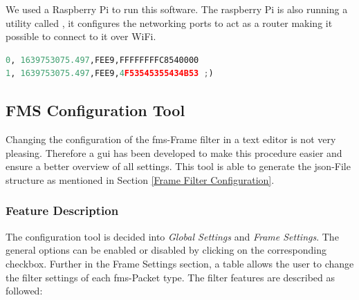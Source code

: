 We used a Raspberry Pi to run this software. The raspberry Pi is also running a utility called , it configures the networking ports to act as a router making it possible to connect to it over WiFi. 


\bigskip
{}
\begin{lstlisting}[backgroundcolor=\color{gray!10},  
                   basicstyle=\ttfamily,
                   columns=fullflexible,
                   breakatwhitespace=false,      
                   breaklines=true,                
                   captionpos=b,                    
                   commentstyle=\color{mygreen}, 
                   extendedchars=true,              
                   frame=single,                   
                   keepspaces=true,             
                   keywordstyle=\color{blue},      
                   language=Python,                 
                   numbers=none,                
                   numbersep=5pt,                   
                   numberstyle=\color{blue}, 
                   rulecolor=\color{mygray},        
                   showspaces=false,
                   showstringspaces=false,
                   showtabs=false,                 
                   stepnumber=5,                  
                   stringstyle=\color{mymauve},    
                   tabsize=2,                      
                   title=\lstname,
                   frame=none,
                   xleftmargin = 1cm,
                   framexleftmargin = 1em]
0, 1639753075.497,FEE9,FFFFFFFFC8540000
1, 1639753075.497,FEE9,4F53545355434B53 ;)
\end{lstlisting}
\newpage

\newpage
\subsection{FMS Configuration Tool}
Changing the configuration of the \acrshort{fms}-Frame filter in a text editor is not very pleasing. Therefore a \acrfull{gui} has been developed to make this procedure easier and ensure a better overview of all settings. This tool is able to generate the \acrshort{json}-File structure as mentioned in Section \ref{Frame Filter Configuration}.

\subsubsection{Feature Description}
The configuration tool is decided into \textit{Global Settings} and \textit{Frame Settings}. The general options can be enabled or disabled by clicking on the corresponding checkbox. Further in the Frame Settings section, a table allows the user to change the filter settings of each \acrshort{fms}-Packet type. The filter features are described as followed:

